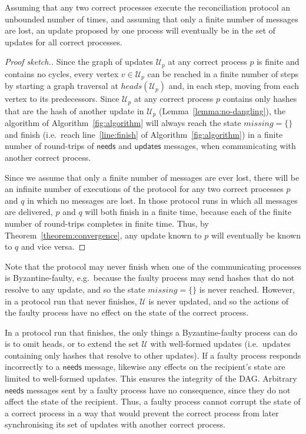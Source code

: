 \documentclass[a4paper,anonymous,USenglish]{lipics-v2019}
\begin{document}
\begin{theorem}\label{theorem:liveness}
Assuming that any two correct processes execute the reconciliation protocol an unbounded number of times, and assuming that only a finite number of messages are lost, an update proposed by one process will eventually be in the set of updates for all correct processes.
\end{theorem}
\begin{proof}[Proof sketch.]
Since the graph of updates $\mathcal{U}_p$ at any correct process $p$ is finite and contains no cycles, every vertex $v \in \mathcal{U}_p$ can be reached in a finite number of steps by starting a graph traversal at $\mathit{heads}(\mathcal{U}_p)$ and, in each step, moving from each vertex to its predecessors.
Since $\mathcal{U}_p$ at any correct process $p$ contains only hashes that are the hash of another update in $\mathcal{U}_p$ (Lemma~\ref{lemma:no-dangling}), the algorithm of Algorithm~\ref{fig:algorithm} will always reach the state $\mathit{missing} = \{\}$ and finish (i.e.\ reach line~\ref{line:finish} of Algorithm~\ref{fig:algorithm}) in a finite number of round-trips of $\mathsf{needs}$ and $\mathsf{updates}$ messages, when communicating with another correct process.

Since we assume that only a finite number of messages are ever lost, there will be an infinite number of executions of the protocol for any two correct processes $p$ and $q$ in which no messages are lost.
In those protocol runs in which all messages are delivered, $p$ and $q$ will both finish in a finite time, because each of the finite number of round-trips completes in finite time.
Thus, by Theorem~\ref{theorem:convergence}, any update known to $p$ will eventually be known to $q$ and vice versa.
\end{proof}

Note that the protocol may never finish when one of the communicating processes is Byzantine-faulty, e.g.\ because the faulty process may send hashes that do not resolve to any update, and so the state $\mathit{missing} = \{\}$ is never reached.
However, in a protocol run that never finishes, $\mathcal{U}$ is never updated, and so the actions of the faulty process have no effect on the state of the correct process.

In a protocol run that finishes, the only things a Byzantine-faulty process can do is to omit heads, or to extend the set $\mathcal{U}$ with well-formed updates (i.e.\ updates containing only hashes that resolve to other updates).
If a faulty process responds incorrectly to a $\mathsf{needs}$ message, likewise any effects on the recipient's state are limited to well-formed updates.
This ensures the integrity of the DAG.
Arbitrary $\mathsf{needs}$ messages sent by a faulty process have no consequence, since they do not affect the state of the recipient.
Thus, a faulty process cannot corrupt the state of a correct process in a way that would prevent the correct process from later synchronising its set of updates with another correct process.
\end{document}
